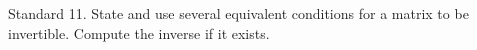 Standard 11.	State and use several equivalent conditions for a matrix to be invertible. Compute the inverse if it exists.

\ifprintanswers
\else %
 \newpage
\fi

\begin{solution}
   
\end{solution}